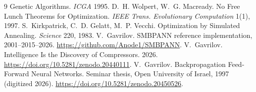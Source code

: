 \documentclass[11pt]{article}
\begin{document}
\begin{thebibliography}{9}
 Genetic Algorithms. \emph{ICGA} 1995.
 D.~H. Wolpert, W.~G. Macready. No Free Lunch Theorems for Optimization. \emph{IEEE Trans.
 Evolutionary Computation} 1(1), 1997.
 S.~Kirkpatrick, C.~D. Gelatt, M.~P. Vecchi. Optimization by Simulated Annealing.
 \emph{Science} 220, 1983.
 V.~Gavrilov. SMBPANN reference implementation, 2001--2015--2026.
 \url{https://github.com/Anode1/SMBPANN}.
 V.~Gavrilov. Intelligence Is the Discovery of Compressors. 2026.
 \url{https://doi.org/10.5281/zenodo.20440111}.
 V.~Gavrilov. Backpropagation Feed-Forward Neural Networks. Seminar thesis, Open
 University of Israel, 1997 (digitized 2026). \url{https://doi.org/10.5281/zenodo.20450526}.
\end{thebibliography}
\end{document}
